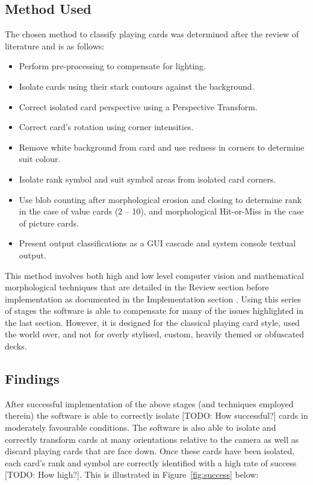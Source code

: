 	\subsection{Method Used}
		The chosen method to classify playing cards was determined after the review of literature and is as follows:
		\begin{itemize}
			\item Perform pre-processing to compensate for lighting.
			\item Isolate cards using their stark contours against the background.
			\item Correct isolated card perspective using a Perspective Transform.
			\item Correct card's rotation using corner intensities.
			\item Remove white background from card and use redness in corners to determine suit colour.
			\item Isolate rank symbol and suit symbol areas from isolated card corners.
			\item Use blob counting after morphological erosion and closing to determine rank in the case of value cards (2 -- 10), and morphological Hit-or-Miss in the case of picture cards.
			\item Present output classifications as a GUI cascade and system console textual output.
		\end{itemize}

		This method involves both high and low level computer vision and mathematical morphological techniques that are detailed in the Review section  before implementation as documented in the Implementation section . Using this series of stages the software is able to compensate for many of the issues highlighted in the last section. However, it is designed for the classical playing card style, used the world over, and not for overly stylised, custom, heavily themed or obfuscated decks.
	\subsection{Findings}
		After successful implementation of the above stages (and techniques employed therein) the software is able to correctly isolate [TODO: How successful?] cards in moderately favourable conditions. The software is also able to isolate and correctly transform cards at many orientations relative to the camera as well as discard playing cards that are face down. Once these cards have been isolated, each card's rank and symbol are correctly identified with a high rate of success [TODO: How high?]. This is illustrated in Figure~\ref{fig:success} below:

